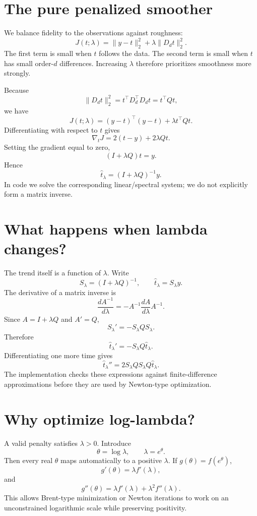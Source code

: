 \documentclass[11pt]{article}
\begin{document}
\section{The pure penalized smoother}
We balance fidelity to the observations against roughness:
\begin{equation}
J(t;\lambda)=\|y-t\|_2^2+\lambda\|D_dt\|_2^2.
\end{equation}
The first term is small when $t$ follows the data. The second term is small when
$t$ has small order-$d$ differences. Increasing $\lambda$ therefore prioritizes
smoothness more strongly.

Because
\[
\|D_dt\|_2^2=t^\top D_d^\top D_dt=t^\top Qt,
\]
we have
\[
J(t;\lambda)=(y-t)^\top(y-t)+\lambda t^\top Qt.
\]
Differentiating with respect to $t$ gives
\[
\nabla_tJ=2(t-y)+2\lambda Qt.
\]
Setting the gradient equal to zero,
\[
(I+\lambda Q)t=y.
\]
Hence
\begin{equation}
\boxed{\widehat t_\lambda=(I+\lambda Q)^{-1}y.}
\end{equation}
In code we solve the corresponding linear/spectral system; we do not explicitly
form a matrix inverse.

\section{What happens when lambda changes?}
The trend itself is a function of $\lambda$. Write
\[
S_\lambda=(I+\lambda Q)^{-1},\qquad \widehat t_\lambda=S_\lambda y.
\]
The derivative of a matrix inverse is
\[
\frac{dA^{-1}}{d\lambda}
=-A^{-1}\frac{dA}{d\lambda}A^{-1}.
\]
Since $A=I+\lambda Q$ and $A'=Q$,
\[
S_\lambda'=-S_\lambda Q S_\lambda.
\]
Therefore
\begin{equation}
\boxed{\widehat t_\lambda'=-S_\lambda Q\widehat t_\lambda.}
\end{equation}
Differentiating one more time gives
\begin{equation}
\boxed{\widehat t_\lambda''=2S_\lambda Q S_\lambda Q\widehat t_\lambda.}
\end{equation}
The implementation checks these expressions against finite-difference
approximations before they are used by Newton-type optimization.

\section{Why optimize log-lambda?}
A valid penalty satisfies $\lambda>0$. Introduce
\[
\theta=\log\lambda,\qquad \lambda=e^\theta.
\]
Then every real $\theta$ maps automatically to a positive $\lambda$. If
$g(\theta)=f(e^\theta)$,
\[
g'(\theta)=\lambda f'(\lambda),
\]
and
\[
g''(\theta)=\lambda f'(\lambda)+\lambda^2f''(\lambda).
\]
This allows Brent-type minimization or Newton iterations to work on an
unconstrained logarithmic scale while preserving positivity.
\end{document}
